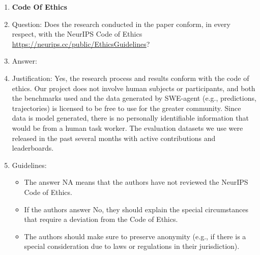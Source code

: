 \begin{enumerate}
\item {\bf Code Of Ethics}
    \item[] Question: Does the research conducted in the paper conform, in every respect, with the NeurIPS Code of Ethics \url{https://neurips.cc/public/EthicsGuidelines}?
    \item[] Answer: \answerYes{}
    \item[] Justification:
    Yes, the research process and results conform with the code of ethics.
    Our project does not involve human subjects or participants, and both the benchmarks used and the data generated by SWE-agent (e.g., predictions, trajectories) is licensed to be free to use for the greater community. Since data is model generated, there is no personally identifiable information that would be from a human task worker.
    The evaluation datasets we use were released in the past several months with active contributions and leaderboards.
    \item[] Guidelines:
    \begin{itemize}
        \item The answer NA means that the authors have not reviewed the NeurIPS Code of Ethics.
        \item If the authors answer No, they should explain the special circumstances that require a deviation from the Code of Ethics.
        \item The authors should make sure to preserve anonymity (e.g., if there is a special consideration due to laws or regulations in their jurisdiction).
    \end{itemize}



\end{enumerate}
